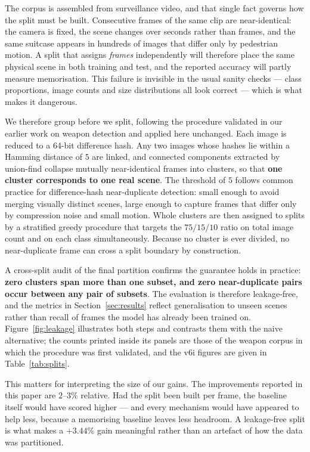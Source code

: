 \documentclass[10pt,twocolumn,a4paper]{article}
\begin{document}


The corpus is assembled from surveillance video, and that single fact governs how
the split must be built. Consecutive frames of the same clip are near-identical:
the camera is fixed, the scene changes over seconds rather than frames, and the
same suitcase appears in hundreds of images that differ only by pedestrian
motion. A split that assigns \emph{frames} independently will therefore place the
same physical scene in both training and test, and the reported accuracy will
partly measure memorisation. This failure is invisible in the usual sanity
checks --- class proportions, image counts and size distributions all look
correct --- which is what makes it dangerous.

We therefore group before we split, following the procedure validated in our
earlier work on weapon detection \cite{catargiu2026weapon} and applied here
unchanged. Each image is reduced to a 64-bit difference hash. Any two images
whose hashes lie within a Hamming distance of $5$ are linked, and connected
components extracted by union-find collapse mutually near-identical frames into
clusters, so that \textbf{one cluster corresponds to one real scene}. The
threshold of $5$ follows common practice for difference-hash near-duplicate
detection: small enough to avoid merging visually distinct scenes, large enough
to capture frames that differ only by compression noise and small motion. Whole
clusters are then assigned to splits by a stratified greedy procedure that
targets the $75/15/10$ ratio on total image count and on each class
simultaneously. Because no cluster is ever divided, no near-duplicate frame can
cross a split boundary by construction.

A cross-split audit of the final partition confirms the guarantee holds in
practice: \textbf{zero clusters span more than one subset, and zero
near-duplicate pairs occur between any pair of subsets}. The evaluation is
therefore leakage-free, and the metrics in Section~\ref{sec:results} reflect
generalisation to unseen scenes rather than recall of frames the model has
already been trained on. Figure~\ref{fig:leakage} illustrates both steps and contrasts them with the
naive alternative; the counts printed inside its panels are those of the weapon
corpus in which the procedure was first validated, and the v6i figures are given
in Table~\ref{tab:splits}.

This matters for interpreting the size of our gains. The improvements reported in
this paper are $2$--$3\%$ relative. Had the split been built per frame, the
baseline itself would have scored higher --- and every mechanism would have
appeared to help less, because a memorising baseline leaves less headroom. A
leakage-free split is what makes a $+3.44\%$ gain meaningful rather than an
artefact of how the data was partitioned.
\end{document}
